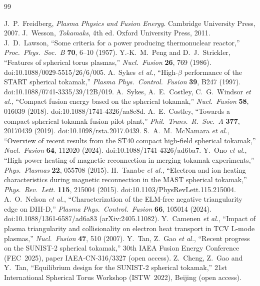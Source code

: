 \documentclass[11pt]{article}
\begin{document}
\begin{thebibliography}{99}
\setlength{\itemsep}{1pt}

 J.~P.~Freidberg, \emph{Plasma Physics and Fusion Energy}. Cambridge University Press, 2007.
 J.~Wesson, \emph{Tokamaks}, 4th ed. Oxford University Press, 2011.
 J.~D.~Lawson, ``Some criteria for a power producing thermonuclear reactor,'' \emph{Proc.\ Phys.\ Soc.\ B} \textbf{70}, 6--10 (1957).
 Y.-K.~M.~Peng and D.~J.~Strickler, ``Features of spherical torus plasmas,'' \emph{Nucl.\ Fusion} \textbf{26}, 769 (1986). doi:10.1088/0029-5515/26/6/005.
 A.~Sykes \emph{et al.}, ``High-$\beta$ performance of the START spherical tokamak,'' \emph{Plasma Phys.\ Control.\ Fusion} \textbf{39}, B247 (1997). doi:10.1088/0741-3335/39/12B/019.
 A.~Sykes, A.~E.~Costley, C.~G.~Windsor \emph{et al.}, ``Compact fusion energy based on the spherical tokamak,'' \emph{Nucl.\ Fusion} \textbf{58}, 016039 (2018). doi:10.1088/1741-4326/aa8c8d.
 A.~E.~Costley, ``Towards a compact spherical tokamak fusion pilot plant,'' \emph{Phil.\ Trans.\ R.\ Soc.\ A} \textbf{377}, 20170439 (2019). doi:10.1098/rsta.2017.0439.
 S.~A.~M.~McNamara \emph{et al.}, ``Overview of recent results from the ST40 compact high-field spherical tokamak,'' \emph{Nucl.\ Fusion} \textbf{64}, 112020 (2024). doi:10.1088/1741-4326/ad6ba7.
 Y.~Ono \emph{et al.}, ``High power heating of magnetic reconnection in merging tokamak experiments,'' \emph{Phys.\ Plasmas} \textbf{22}, 055708 (2015).
 H.~Tanabe \emph{et al.}, ``Electron and ion heating characteristics during magnetic reconnection in the MAST spherical tokamak,'' \emph{Phys.\ Rev.\ Lett.} \textbf{115}, 215004 (2015). doi:10.1103/PhysRevLett.115.215004.
 A.~O.~Nelson \emph{et al.}, ``Characterization of the ELM-free negative triangularity edge on DIII-D,'' \emph{Plasma Phys.\ Control.\ Fusion} \textbf{66}, 105014 (2024). doi:10.1088/1361-6587/ad6a83 (arXiv:2405.11082).
 Y.~Camenen \emph{et al.}, ``Impact of plasma triangularity and collisionality on electron heat transport in TCV L-mode plasmas,'' \emph{Nucl.\ Fusion} \textbf{47}, 510 (2007).
 Y.~Tan, Z.~Gao \emph{et al.}, ``Recent progress on the SUNIST-2 spherical tokamak,'' 30th IAEA Fusion Energy Conference (FEC~2025), paper IAEA-CN-316/3327 (open access).
 Z.~Cheng, Z.~Gao and Y.~Tan, ``Equilibrium design for the SUNIST-2 spherical tokamak,'' 21st International Spherical Torus Workshop (ISTW~2022), Beijing (open access).

\end{thebibliography}
\end{document}
